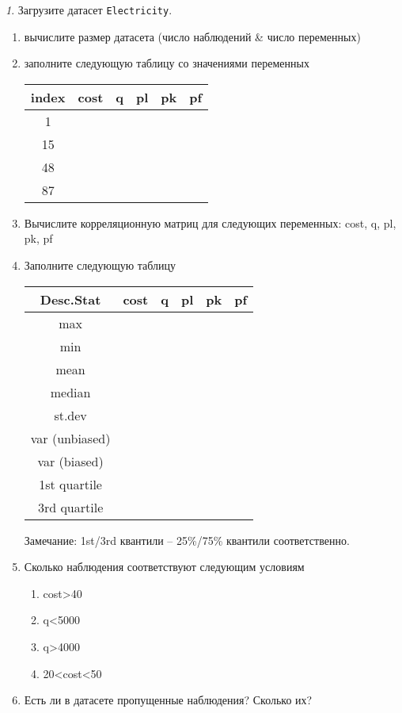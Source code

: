 \documentclass[12pt]{article}
\theoremstyle{remark}
\newtheorem{exercise}{}[section]
\begin{document}
\begin{exercise}
Загрузите датасет \texttt{Electricity}.
\begin{enumerate}
	\item вычислите размер датасета (число наблюдений \& число переменных)
	\item заполните следующую таблицу со значениями переменных
	\begin{center}
		\begin{tabular}{|c|c|c|c|c|c|} \hline
			index & cost & q & pl & pk & pf \\ \hline\hline
			1 & & & & & \\ \hline
			15 & & & &  & \\ \hline
			48 & & & & & \\ \hline
			87 & & & & & \\ \hline
		\end{tabular}
	\end{center}
	\item Вычислите корреляционную матриц для следующих переменных: cost, q, pl, pk, pf 
	\item Заполните следующую таблицу
	\begin{center}
		\begin{tabular}{|c|c|c|c|c|c|} \hline
			Desc.Stat & cost & q & pl & pk & pf\\ \hline\hline
			max & & & & & \\ \hline
			min & & & & & \\ \hline
			mean & & & &  & \\ \hline
			median & & & & & \\ \hline
			st.dev & & & & & \\ \hline
			var (unbiased) & & & & & \\ \hline
			var (biased) & & & & & \\ \hline
			1st quartile & & & & & \\ \hline
			3rd quartile & & & & & \\ \hline
		\end{tabular}
	\end{center}
	Замечание: 1st/3rd квантили -- 25\%/75\% квантили соответственно.
	\item Сколько наблюдения соответствуют следующим условиям
		\begin{enumerate}
			\item cost>40
			\item q<5000
			\item q>4000
			\item 20<cost<50
		\end{enumerate}
	\item Есть ли в датасете пропущенные наблюдения?
	Сколько их?
\end{enumerate}
\end{exercise}
\end{document}
